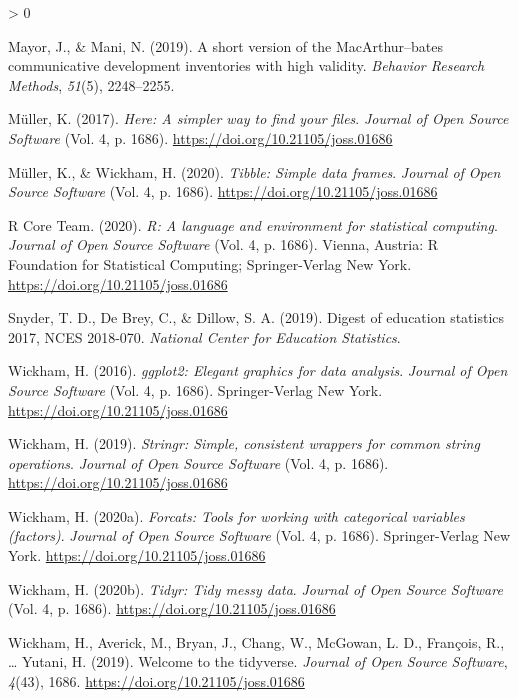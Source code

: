 \documentclass[
  english,
  ,man,floatsintext]{apa6}
\newlength{\cslhangindent}
\newenvironment{CSLReferences}[2] %
 {%
  \setlength{\parindent}{0pt}
  \ifodd #1 \everypar{\setlength{\hangindent}{\cslhangindent}}\ignorespaces\fi
  \ifnum #2 > 0
  \setlength{\parskip}{#2\baselineskip}
  \fi
 }%
 {}
\begin{document}
\begin{CSLReferences}{1}{0}
\leavevmode\hypertarget{ref-Mayor2019}{}%
Mayor, J., \& Mani, N. (2019). A short version of the MacArthur--bates communicative development inventories with high validity. \emph{Behavior Research Methods}, \emph{51}(5), 2248--2255.

\leavevmode\hypertarget{ref-R-here}{}%
Müller, K. (2017). \emph{Here: A simpler way to find your files}. \emph{Journal of Open Source Software} (Vol. 4, p. 1686). \url{https://doi.org/10.21105/joss.01686}

\leavevmode\hypertarget{ref-R-tibble}{}%
Müller, K., \& Wickham, H. (2020). \emph{Tibble: Simple data frames}. \emph{Journal of Open Source Software} (Vol. 4, p. 1686). \url{https://doi.org/10.21105/joss.01686}

\leavevmode\hypertarget{ref-R-base}{}%
R Core Team. (2020). \emph{R: A language and environment for statistical computing}. \emph{Journal of Open Source Software} (Vol. 4, p. 1686). Vienna, Austria: R Foundation for Statistical Computing; Springer-Verlag New York. \url{https://doi.org/10.21105/joss.01686}

\leavevmode\hypertarget{ref-Snyder2019}{}%
Snyder, T. D., De Brey, C., \& Dillow, S. A. (2019). Digest of education statistics 2017, NCES 2018-070. \emph{National Center for Education Statistics}.

\leavevmode\hypertarget{ref-R-ggplot2}{}%
Wickham, H. (2016). \emph{ggplot2: Elegant graphics for data analysis}. \emph{Journal of Open Source Software} (Vol. 4, p. 1686). Springer-Verlag New York. \url{https://doi.org/10.21105/joss.01686}

\leavevmode\hypertarget{ref-R-stringr}{}%
Wickham, H. (2019). \emph{Stringr: Simple, consistent wrappers for common string operations}. \emph{Journal of Open Source Software} (Vol. 4, p. 1686). \url{https://doi.org/10.21105/joss.01686}

\leavevmode\hypertarget{ref-R-forcats}{}%
Wickham, H. (2020a). \emph{Forcats: Tools for working with categorical variables (factors)}. \emph{Journal of Open Source Software} (Vol. 4, p. 1686). Springer-Verlag New York. \url{https://doi.org/10.21105/joss.01686}

\leavevmode\hypertarget{ref-R-tidyr}{}%
Wickham, H. (2020b). \emph{Tidyr: Tidy messy data}. \emph{Journal of Open Source Software} (Vol. 4, p. 1686). \url{https://doi.org/10.21105/joss.01686}

\leavevmode\hypertarget{ref-R-tidyverse}{}%
Wickham, H., Averick, M., Bryan, J., Chang, W., McGowan, L. D., François, R., \ldots{} Yutani, H. (2019). Welcome to the {tidyverse}. \emph{Journal of Open Source Software}, \emph{4}(43), 1686. \url{https://doi.org/10.21105/joss.01686}


\end{CSLReferences}
\end{document}
